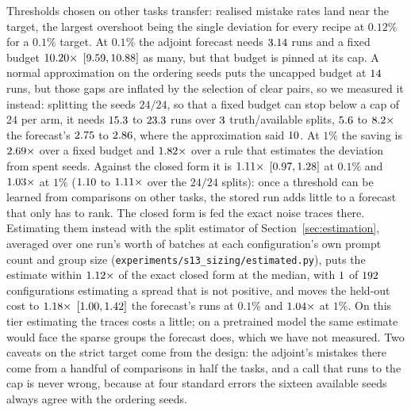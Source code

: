 Thresholds chosen on other tasks transfer: realised mistake rates land near the target, the
largest overshoot being the single deviation for every recipe at $0.12\%$ for a $0.1\%$ target. At
$0.1\%$ the adjoint forecast needs $3.14$ runs and a fixed budget
$10.20\times$ $[9.59, 10.88]$ as many, but that
budget is pinned at its cap. A normal approximation on the ordering seeds puts the uncapped budget
at $14$ runs, but those gaps are inflated by the selection of clear
pairs, so we measured it instead: splitting the seeds $24/24$, so that a fixed budget can stop
below a cap of $24$ per arm, it needs $15.3$ to $23.3$ runs over
$3$ truth/available splits, $5.6$ to $8.2\times$ the
forecast's $2.75$ to $2.86$, where the approximation said
$10$. At $1\%$ the saving is $2.69\times$ over a fixed budget
and $1.82\times$ over a rule that estimates the deviation from spent seeds.
Against the closed form it is $1.11\times$
$[0.97, 1.28]$ at $0.1\%$ and $1.03\times$ at
$1\%$ ($1.10$ to $1.11\times$ over the $24/24$ splits): once a
threshold can be learned from comparisons on other tasks, the stored run adds little to a forecast
that only has to rank. The closed form is fed the exact noise traces there. Estimating them
instead with the split estimator of Section~\ref{sec:estimation}, averaged over one run's worth of
batches at each configuration's own prompt count and group size
(\texttt{experiments/s13\_sizing/estimated.py}), puts the estimate within $1.12\times$
of the exact closed form at the median, with $1$ of $192$
configurations estimating a spread that is not positive, and moves the held-out cost to
$1.18\times$ $[1.00, 1.42]$ the forecast's runs at $0.1\%$ and
$1.04\times$ at $1\%$. On this tier estimating the traces costs a little; on a
pretrained model the same estimate would face the sparse groups the forecast does, which we have
not measured. Two caveats on the strict target come from the design: the
adjoint's mistakes there come from a handful of comparisons in half the tasks, and a call that runs
to the cap is never wrong, because at four standard errors the sixteen available seeds always agree
with the ordering seeds.

